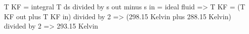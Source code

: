T KF = integral T ds divided by s out minus s in = ideal fluid  
=> T KF = (T KF out plus T KF in) divided by 2  
=> (298.15 Kelvin plus 288.15 Kelvin) divided by 2  
=> 293.15 Kelvin